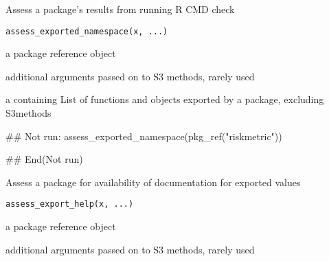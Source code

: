 \documentclass[a4paper]{book}
\begin{document}
%
\begin{Description}
Assess a package's results from running R CMD check
\end{Description}
%
\begin{Usage}
\begin{verbatim}
assess_exported_namespace(x, ...)
\end{verbatim}
\end{Usage}
%
\begin{Arguments}
\begin{ldescription}
\item[\code{x}] a  package reference object

\item[\code{...}] additional arguments passed on to S3 methods, rarely used
\end{ldescription}
\end{Arguments}
%
\begin{Value}
a  containing List of functions and objects exported by a package, excluding S3methods
\end{Value}
%
\begin{SeeAlso}
\end{SeeAlso}
%
\begin{Examples}
\begin{ExampleCode}
## Not run: 
assess_exported_namespace(pkg_ref("riskmetric"))

## End(Not run)
\end{ExampleCode}
\end{Examples}
%
\begin{Description}
Assess a package for availability of documentation for exported values
\end{Description}
%
\begin{Usage}
\begin{verbatim}
assess_export_help(x, ...)
\end{verbatim}
\end{Usage}
%
\begin{Arguments}
\begin{ldescription}
\item[\code{x}] a  package reference object

\item[\code{...}] additional arguments passed on to S3 methods, rarely used
\end{ldescription}
\end{Arguments}
\end{document}
